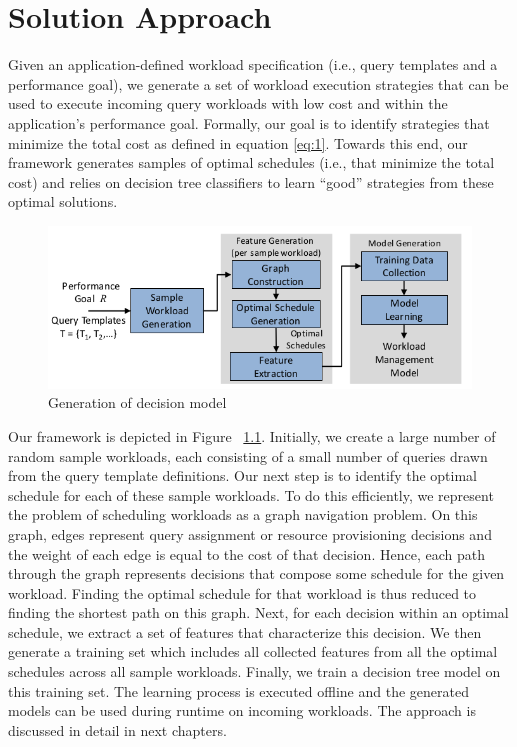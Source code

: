 \chapter{Solution Approach}
Given an application-defined workload specification (i.e., query templates and a performance goal), we generate a set of workload execution strategies that can be used to execute incoming query workloads with low cost and within the application’s performance goal. Formally, our goal is to identify strategies that minimize the total cost as defined in equation \eqref{eq:1}.
Towards this end, our framework generates samples of optimal schedules (i.e., that minimize the total cost) and relies on decision tree classifiers to learn “good” strategies from these optimal solutions. 
\begin{figure}
\centering
\includegraphics[width=1.0\textwidth]{generation.png}
\caption{\label{fig:generation}Generation of decision model}
\end{figure}
Our framework is depicted in Figure ~\ref{fig:generation}. Initially, we create a large number of random sample workloads, each consisting of a small number of queries drawn from the query template definitions. Our next step is to identify the optimal schedule for each of these sample workloads. To do this efficiently, we represent the problem of scheduling workloads as a graph navigation problem. On this graph, edges represent query assignment or resource provisioning decisions and the weight of each edge is equal to the cost of that decision. Hence, each path through the graph represents decisions that compose some schedule for the given workload. Finding the optimal schedule for that workload is thus reduced to finding the shortest path on this graph. Next, for each decision within an optimal schedule, we extract a set of features that characterize this decision. We then generate a training set which includes all collected features from all the optimal schedules across all sample workloads. Finally, we train a decision tree model on this training set. The learning process is executed offline and the generated models can be used during runtime on incoming workloads. The approach is discussed in detail in next chapters.
